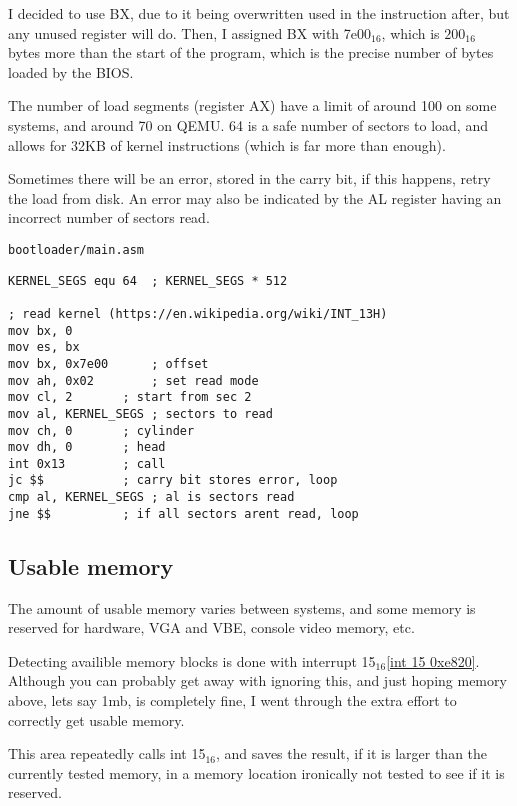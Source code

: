 \documentclass{article}
\begin{document}
I decided to use BX, due to it being overwritten used in the instruction after,
but any unused register will do. Then, I assigned BX with 7e00$_{16}$, which is
$200_{16}$ bytes more than the start of the program\cite{7c00}, which is the
precise number of bytes loaded by the BIOS\cite{sector size}.

The number of load segments (register AX)\cite{int 13h} have a limit of around 100
on some systems, and around 70 on QEMU. 64 is a safe number of sectors to load,
and allows for 32KB of kernel instructions (which is far more than enough).

Sometimes there will be an error, stored in the carry bit\cite{int 13h}, if this
happens, retry the load from disk. An error may also be indicated by the AL register
having an incorrect number of sectors read.

\begin{verbatim}
bootloader/main.asm
\end{verbatim}
\begin{verbatim}
KERNEL_SEGS equ 64	; KERNEL_SEGS * 512

; read kernel (https://en.wikipedia.org/wiki/INT_13H)
mov bx, 0
mov es, bx
mov bx, 0x7e00		; offset
mov ah, 0x02		; set read mode
mov cl, 2		; start from sec 2
mov al, KERNEL_SEGS	; sectors to read
mov ch, 0		; cylinder
mov dh, 0		; head
int 0x13		; call
jc $$			; carry bit stores error, loop
cmp al, KERNEL_SEGS	; al is sectors read
jne $$			; if all sectors arent read, loop
\end{verbatim}

\subsection{Usable memory}

The amount of usable memory varies between systems,
and some memory is reserved for hardware, VGA and VBE,
console video memory, etc.

Detecting availible memory blocks is done with interrupt
15$_{16}$\cite{int 15h}\ref{int 15 0xe820}. Although you can probably get
away with ignoring this, and just hoping memory above,
lets say 1mb, is completely fine, I went through the extra
effort to correctly get usable memory.

This area repeatedly calls int 15$_{16}$, and saves the result,
if it is larger than the currently tested memory, in a memory location
ironically not tested to see if it is reserved.
\end{document}
